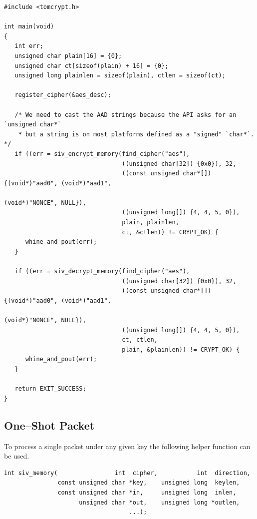 \documentclass[synpaper]{book}
\begin{document}
\begin{small}
\begin{verbatim}
#include <tomcrypt.h>

int main(void)
{
   int err;
   unsigned char plain[16] = {0};
   unsigned char ct[sizeof(plain) + 16] = {0};
   unsigned long plainlen = sizeof(plain), ctlen = sizeof(ct);

   register_cipher(&aes_desc);

   /* We need to cast the AAD strings because the API asks for an `unsigned char*`
    * but a string is on most platforms defined as a "signed" `char*`. */
   if ((err = siv_encrypt_memory(find_cipher("aes"),
                                 ((unsigned char[32]) {0x0}), 32,
                                 ((const unsigned char*[]) {(void*)"aad0", (void*)"aad1",
                                                            (void*)"NONCE", NULL}),
                                 ((unsigned long[]) {4, 4, 5, 0}),
                                 plain, plainlen,
                                 ct, &ctlen)) != CRYPT_OK) {
      whine_and_pout(err);
   }

   if ((err = siv_decrypt_memory(find_cipher("aes"),
                                 ((unsigned char[32]) {0x0}), 32,
                                 ((const unsigned char*[]) {(void*)"aad0", (void*)"aad1",
                                                            (void*)"NONCE", NULL}),
                                 ((unsigned long[]) {4, 4, 5, 0}),
                                 ct, ctlen,
                                 plain, &plainlen)) != CRYPT_OK) {
      whine_and_pout(err);
   }

   return EXIT_SUCCESS;
}
\end{verbatim}
\end{small}

\subsection{One--Shot Packet}
To process a single packet under any given key the following helper function can be used.

\begin{verbatim}
int siv_memory(                int  cipher,           int  direction,
               const unsigned char *key,    unsigned long  keylen,
               const unsigned char *in,     unsigned long  inlen,
                     unsigned char *out,    unsigned long *outlen,
                                   ...);
\end{verbatim}
\end{document}
